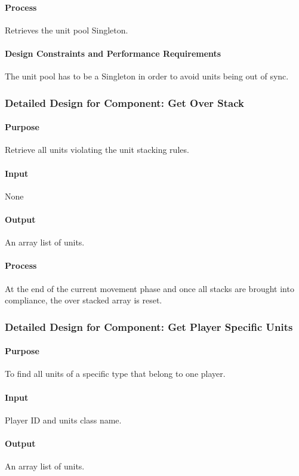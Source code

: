 \documentclass[12pt,a4paper,titlepage]{article}
\begin{document}
\paragraph{Process} Retrieves the unit pool Singleton.
\paragraph{Design Constraints and Performance Requirements} The unit pool has to be a Singleton in order to avoid units being out of sync.

\subsubsection{Detailed Design for Component: Get Over Stack}
\paragraph{Purpose} Retrieve all units violating the unit stacking rules.
\paragraph{Input} None
\paragraph{Output} An array list of units.
\paragraph{Process} At the end of the current movement phase and once all stacks are brought into compliance, the over stacked array is reset.

\subsubsection{Detailed Design for Component: Get Player Specific Units}
\paragraph{Purpose} To find all units of a specific type that belong to one player.
\paragraph{Input} Player ID and units class name.
\paragraph{Output} An array list of units.
\end{document}
